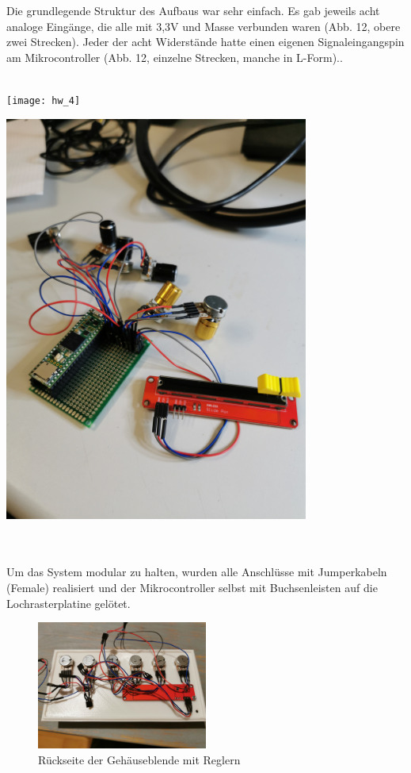 \documentclass[12pt]{scrartcl}%
\theoremstyle{nonumberplain}
\begin{document}
Die grundlegende Struktur des Aufbaus war sehr einfach. Es gab jeweils acht analoge Eingänge, die alle mit 3,3V und Masse verbunden waren (Abb. 12, obere zwei Strecken). Jeder der acht Widerstände hatte einen eigenen Signaleingangspin am Mikrocontroller (Abb. 12, einzelne Strecken, manche in L-Form)..\\\\
\begin{minipage}[t]{0.5\textwidth}
\centering
\texttt{[image: hw\_4]}
\end{minipage}
\begin{minipage}[t]{0.5\textwidth}
\centering
\includegraphics[width=0.75\textwidth]{hw_5}
\end{minipage}\\\\
Um das System modular zu halten, wurden alle Anschlüsse mit Jumperkabeln (Female) realisiert und der Mikrocontroller selbst mit Buchsenleisten auf die Lochrasterplatine gelötet.\\
\begin{figure}[h]
\centering
  \includegraphics[width=0.5\textwidth]{hw_6}
  \caption{Rückseite der Gehäuseblende mit Reglern}
\end{figure}
\end{document}
